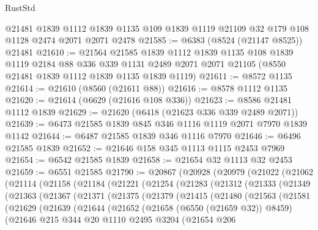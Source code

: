 \begin{lexlean}{RustStd}
\begin{coremodule}
    @21481
    @1839
    @1112
    @1839
    @1135
    @109
    @1839
    @1119
    @21109
    @32
    @179
    @108
    @1128
    @2474
    @2071
    @2071
    @2478
@21585 := @6383 (@8524 (@21147 @8525)) @21481
@21610 := @21564
    @21585
    @1839
    @1112
    @1839
    @1135
    @108
    @1839
    @1119
    @2184
    @88
    @336
    @339
    @1131
    @2489
    @2071
    @2071
    @21105
    (@8550 @21481 @1839 @1112 @1839 @1135 @1839 @1119)
@21611 := @8572 @1135
@21614 := @21610 (@8560 (@21611 @88))
@21616 := @8578 @1112 @1135
@21620 := @21614 (@6629 (@21616 @108 @336))
@21623 := @8586 @21481 @1112 @1839
@21629 := @21620 (@6418 (@21623 @336 @339 @2489 @2071))
@21639 := @6473 @21585 @1839 @845 @346 @1116 @1119 @2071 @7970 @1839 @1142
@21644 := @6487 @21585 @1839 @346 @1116 @7970
@21646 := @6496 @21585 @1839
@21652 := @21646 @158 @345 @1113 @1115 @2453 @7969
@21654 := @6542 @21585 @1839
@21658 := @21654 @32 @1113 @32 @2453
@21659 := @6551 @21585
@21790 := @20867
    (@20928
      (@20979
        (@21022
          (@21062
            (@21114
              (@21158
                (@21184
                  (@21221
                    (@21254
                      (@21283
                        (@21312
                          (@21333
                            (@21349
                              (@21363
                                (@21367
                                  (@21371
                                    (@21375
                                      (@21379
                                        (@21415
                                          (@21480
                                            (@21563
                                              (@21581
                                                (@21629
                                                  (@21639
                                                    (@21644
                                                      (@21652
                                                        (@21658 (@6550 (@21659 @32)) @8459)
                                                        (@21646
                                                          @215
                                                          @344
                                                          @20
                                                          @1110
                                                          @2495
                                                          @3204
                                                          (@21654
                                                            @206

\end{coremodule}
\end{lexlean}
